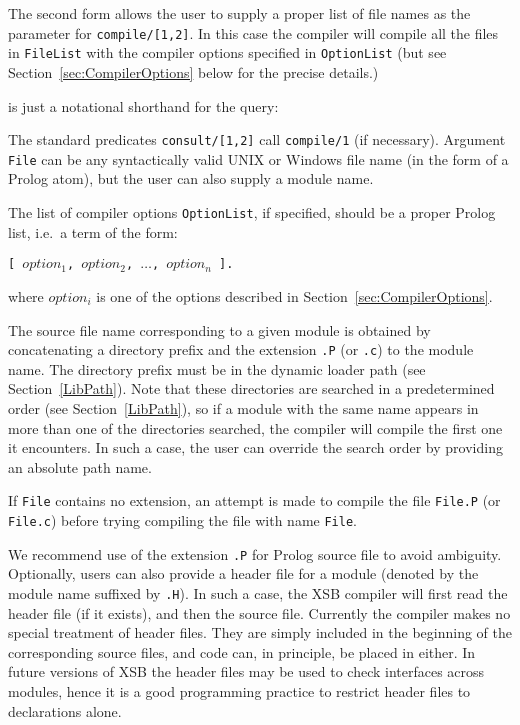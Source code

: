 The second form allows the user to supply a proper list of file names as
the parameter for {\tt compile/[1,2]}.  In this case the compiler will
compile all the files in {\tt FileList} with the compiler
options specified in {\tt OptionList} (but see
Section~\ref{sec:CompilerOptions} below for the precise details.)


\noindent
is just a notational shorthand for the query:


The standard predicates {\tt consult/[1,2]} call {\tt compile/1} (if
necessary).  Argument {\tt File} can be any syntactically valid UNIX
or Windows file name (in the form of a Prolog atom), but the user can also
supply a module name.

The list of compiler options {\tt OptionList}, if specified, 
should be a proper Prolog list, i.e.\ a term of the form:
\begin{center}
	{\tt [ $option_1$, $option_2$, $\ldots$, $option_n$ ].}
\end{center}
where $option_i$ is one of the options described in
Section~\ref{sec:CompilerOptions}.

The source file name corresponding to a given module is obtained by 
concatenating a directory prefix and the extension {\tt .P} (or {\tt .c}) 
to the module name.  The directory prefix must be in the
dynamic loader path (see Section~\ref{LibPath}).
Note that these directories are searched in a predetermined
order (see Section~\ref{LibPath}), so if a module with the same name
appears in more than one of the directories searched, the compiler 
will compile the first one it encounters.  In such a case, the user can 
override the search order by providing an absolute path name.

If {\tt File} contains no extension, an attempt is made to compile the 
file {\tt File.P} (or {\tt File.c}) before trying compiling the file 
with name {\tt File}.  

We recommend use of the extension {\tt .P} for Prolog source file to
avoid ambiguity.  Optionally, users can also provide a header file for
a module (denoted by the module name suffixed by {\tt .H}).  In such a
case, the XSB compiler will first read the header file (if it
exists), and then the source file.  Currently the compiler makes no
special treatment of header files.  They are simply included in the
beginning of the corresponding source files, and code can, in
principle, be placed in either.  In future versions of XSB the
header files may be used to check interfaces across modules, hence it
is a good programming practice to restrict header files to
declarations alone.
 
